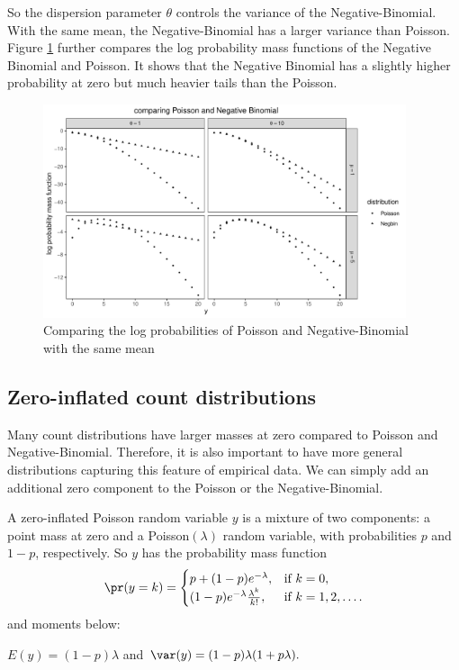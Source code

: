 So the dispersion parameter $\theta$ controls the variance of the Negative-Binomial. With the same mean, the Negative-Binomial has a larger variance than Poisson. Figure \ref{fig::poisson-negativebinomial} further compares the log probability mass functions of the Negative Binomial and Poisson. It shows that the Negative Binomial has a slightly higher probability at zero but much heavier tails than the Poisson. 


\begin{figure}[ht]
\centering
\includegraphics[width = 0.95\textwidth]{figures/poisson_negbin.pdf}
\caption{Comparing the log probabilities of Poisson and Negative-Binomial with the same mean}
\label{fig::poisson-negativebinomial}
\end{figure}



\subsection{Zero-inflated count distributions}

Many count distributions have larger masses at zero compared to Poisson and Negative-Binomial. Therefore, it is also important to have more general distributions capturing this feature of empirical data. We can simply add an additional zero component to the Poisson or the Negative-Binomial. 


A zero-inflated Poisson random variable $y$ is a mixture of two components:
a point mass at zero and a Poisson$(\lambda)$ random variable, with
probabilities $p$ and $1-p$, respectively. So $y$ has the probability
mass function
\[
\pr(y=k)=\begin{cases}
p+(1-p)e^{-\lambda}, & \text{if }k=0,\\
(1-p)e^{-\lambda}\frac{\lambda^{k}}{k!}, & \text{if }k=1,2,\ldots.
\end{cases}
\]
and moments below:
\begin{proposition}
\label{proposition:moments-zeroinflated-poisson}$E(y)=(1-p)\lambda$ and $\var(y)=(1-p)\lambda(1+p\lambda).$
\end{proposition}




